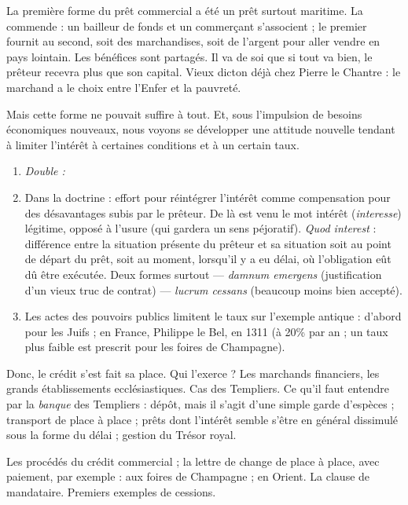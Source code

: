 \documentclass[french,twoside]{book} %
\newlength{\listmod}
\newcommand{\listhead}[1]{\hspace{-1\listmod}\emph{#1}}
\begin{document}
\label{p95} La première forme du prêt commercial a été un prêt surtout maritime. La commende : un bailleur de fonds et un commerçant s’associent ; le premier fournit au second, soit des marchandises, soit de l’argent pour aller vendre en pays lointain. Les bénéfices sont partagés. Il va de soi que si tout va bien, le prêteur recevra plus que son capital. Vieux dicton déjà chez Pierre le Chantre : le marchand a le choix entre l’Enfer et la pauvreté.\par
Mais cette forme ne pouvait suffire à tout. Et, sous l’impulsion de besoins économiques nouveaux, nous voyons se développer une attitude nouvelle tendant à limiter l’intérêt à certaines conditions et à un certain taux.\par

\begin{enumerate}[itemsep=0pt,]
\item[]\listhead{Double :}
\item Dans la doctrine : effort pour réintégrer l’intérêt comme compensation pour des désavantages subis par le prêteur. De là est venu le mot intérêt ({\itshape interesse}) légitime, opposé à l’usure (qui gardera un sens péjoratif). {\itshape Quod interest} : différence entre la situation présente du prêteur et sa situation soit au point de départ du prêt, soit au moment, lorsqu’il y a eu délai, où l’obligation eût dû être exécutée. Deux formes surtout — {\itshape damnum emergens} (justification d’un vieux truc de contrat) — {\itshape lucrum cessans} (beaucoup moins bien accepté).
\item Les actes des pouvoirs publics limitent le taux sur l’exemple antique : d’abord pour les Juifs ; en France, Philippe le Bel, en 1311 (à 20\% par an ; un taux plus faible est prescrit pour les foires de Champagne).

\end{enumerate}\noindent Donc, le crédit s’est fait sa place. Qui l’exerce ? Les marchands financiers, les grands établissements ecclésiastiques. Cas des Templiers. Ce qu’il faut entendre par la \emph{banque} des Templiers : dépôt, mais il s’agit d’une simple garde d’espèces ; transport de place à place ; prêts dont l’intérêt semble s’être en général dissimulé sous la forme du délai ; gestion du Trésor royal.\par
Les procédés du crédit commercial ; la lettre de change de place à place, avec paiement, par exemple : aux foires de Champagne ; en Orient. La clause de mandataire. Premiers exemples de cessions.
\end{document}
